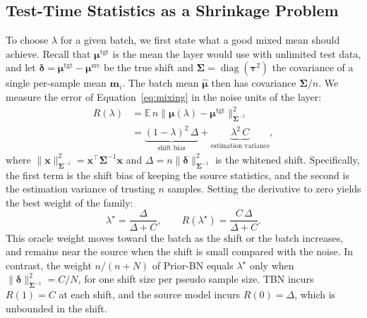 \subsection{Test-Time Statistics as a Shrinkage Problem} \label{sec:shrinkage-problem}
To choose $\lambda$ for a given batch, we first state what a good mixed mean should achieve.
Recall that $\boldsymbol{\mu}^{\text{tgt}}$ is the mean the layer would use with unlimited test data, and let $\boldsymbol{\delta} = \boldsymbol{\mu}^{\text{tgt}} - \boldsymbol{\mu}^{\text{src}}$ be the true shift and $\boldsymbol{\Sigma} = \operatorname{diag}(\boldsymbol{\tau}^2)$ the covariance of a single per-sample mean $\mathbf{m}_i$.
The batch mean $\hat{\boldsymbol{\mu}}$ then has covariance $\boldsymbol{\Sigma}/n$.
We measure the error of Equation~\ref{eq:mixing} in the noise units of the layer:
\begin{equation}\label{eq:risk}
\begin{aligned}
R(\lambda) &= \mathbb{E}\, n \big\|\boldsymbol{\mu}(\lambda) - \boldsymbol{\mu}^{\text{tgt}}\big\|^{2}_{\boldsymbol{\Sigma}^{-1}}\\
&= \underbrace{(1-\lambda)^{2}\,\Delta}_{\text{shift bias}} + \underbrace{\lambda^{2}\,C}_{\text{estimation variance}},
\end{aligned}
\end{equation}
where $\|\mathbf{x}\|^2_{\boldsymbol{\Sigma}^{-1}} = \mathbf{x}^{\top}\boldsymbol{\Sigma}^{-1}\mathbf{x}$ and $\Delta = n\|\boldsymbol{\delta}\|^2_{\boldsymbol{\Sigma}^{-1}}$ is the whitened shift.
Specifically, the first term is the shift bias of keeping the source statistics, and the second is the estimation variance of trusting $n$ samples.
Setting the derivative to zero yields the best weight of the family:
\begin{equation}\label{eq:oracle}
\lambda^{\star} = \frac{\Delta}{\Delta + C}, \qquad R(\lambda^{\star}) = \frac{C\,\Delta}{\Delta + C}.
\end{equation}
This oracle weight moves toward the batch as the shift or the batch increases, and remains near the source when the shift is small compared with the noise.
In contrast, the weight $n/(n+N)$ of Prior-BN equals $\lambda^{\star}$ only when $\|\boldsymbol{\delta}\|^2_{\boldsymbol{\Sigma}^{-1}} = C/N$, \ie for one shift size per pseudo sample size.
TBN incurs $R(1) = C$ at each shift, and the source model incurs $R(0) = \Delta$, which is unbounded in the shift.

